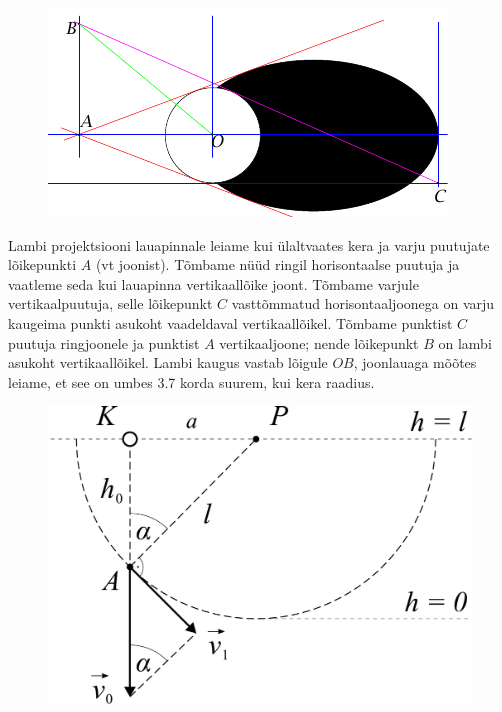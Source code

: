 \documentclass[10pt]{article}
\begin{document}

\solu
\begin{figure}[h]
    \centering
    \includegraphics[width=.7\linewidth]{2024-lahg-06-yl.pdf}
\end{figure}

Lambi projektsiooni lauapinnale leiame kui ülaltvaates kera ja varju puutujate lõikepunkti $A$ (vt joonist). Tõmbame nüüd ringil horisontaalse puutuja ja vaatleme seda kui lauapinna vertikaallõike joont. Tõmbame varjule vertikaalpuutuja, selle lõikepunkt $C$ vasttõmmatud horisontaaljoonega on varju kaugeima punkti asukoht vaadeldaval vertikaallõikel. Tõmbame punktist $C$ puutuja ringjoonele ja punktist $A$ vertikaaljoone; nende lõikepunkt $B$ on lambi asukoht vertikaallõikel. Lambi kaugus vastab lõigule $OB$, joonlauaga mõõtes leiame, et see on umbes \SI{3.7}{} korda suurem, kui kera raadius.
\probend
\bigskip


\solu
\begin{figure}
  \vspace{-1em}
  \begin{center}
    \includegraphics[width=1\linewidth]{2024-v2g-06-yl1.pdf}
  \end{center}
  \vspace{-1em}
\end{figure}
\end{document}
